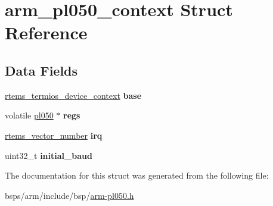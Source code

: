 \hypertarget{structarm__pl050__context}{}\section{arm\+\_\+pl050\+\_\+context Struct Reference}
\label{structarm__pl050__context}
\subsection*{Data Fields}
\begin{DoxyCompactItemize}
\item 
\mbox{\label{structarm__pl050__context_ac7562bbcfa023f925d68e47d0bba5ea3}} 
\mbox{\hyperlink{structrtems__termios__device__context}{rtems\+\_\+termios\+\_\+device\+\_\+context}} {\bfseries base}
\item 
\mbox{\label{structarm__pl050__context_a7ede706b097b1e11dac33f8f196d5d26}} 
volatile \mbox{\hyperlink{structpl050}{pl050}} $\ast$ {\bfseries regs}
\item 
\mbox{\label{structarm__pl050__context_a147037d20bd9e73f71250e95dfb2390c}} 
\mbox{\hyperlink{group__ClassicINTR_ga3e434c197d99f128e78cae4d9358bd8b}{rtems\+\_\+vector\+\_\+number}} {\bfseries irq}
\item 
\mbox{\label{structarm__pl050__context_acf8f21cb944b436a89fe4bea0c71b93d}} 
uint32\+\_\+t {\bfseries initial\+\_\+baud}
\end{DoxyCompactItemize}


The documentation for this struct was generated from the following file\+:\begin{DoxyCompactItemize}
\item 
bsps/arm/include/bsp/\mbox{\hyperlink{arm-pl050_8h}{arm-\/pl050.\+h}}\end{DoxyCompactItemize}

